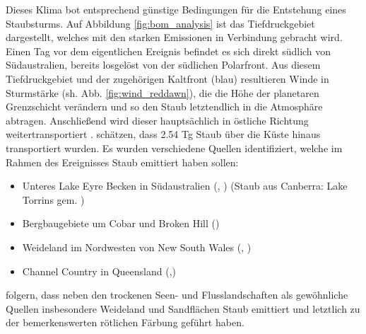 \documentclass[12pt,a4paper,onecolumn,headheight=30pt]{scrartcl}
\begin{document}
Dieses Klima bot entsprechend günstige Bedingungen für die Entstehung eines Staubsturms. Auf Abbildung \ref{fig:bom_analysis} ist das Tiefdruckgebiet dargestellt, welches mit den starken Emissionen in Verbindung gebracht wird. Einen Tag vor dem eigentlichen Ereignis befindet es sich direkt südlich von Südaustralien, bereits losgelöst von der südlichen Polarfront. Aus diesem Tiefdruckgebiet und der zugehörigen Kaltfront (blau) resultieren Winde in Sturmstärke (sh. Abb. \ref{fig:wind_reddawn}), die die Höhe der planetaren Grenzschicht verändern \citep{AlizadehChoobari.2012} und so den Staub letztendlich in die Atmosphäre abtragen. Anschließend wird dieser hauptsächlich in östliche Richtung weitertransportiert \citep{Leys.2011}.\citet{Leys.2011} schätzen, dass 2.54 Tg Staub über die Küste hinaus transportiert wurden.  Es wurden verschiedene Quellen identifiziert, welche im Rahmen des Ereignisses Staub emittiert haben sollen:
\begin{itemize}
\item Unteres Lake Eyre Becken in Südaustralien (\cite{Leys.2011}, \cite{Leys.2009}) (Staub aus Canberra: Lake Torrins gem. \cite{Deckker.2014})
\item Bergbaugebiete um Cobar und Broken Hill  (\cite{Leys.2011})
\item Weideland im Nordwesten von New South Wales (\cite{Leys.2011}, \cite{Leys.2009})
\item Channel Country in Queensland (\cite{Leys.2011},\cite{Leys.2009})
\end{itemize}
\citet{Leys.2011} folgern, dass neben den trockenen Seen- und Flusslandschaften als gewöhnliche Quellen insbesondere Weideland und Sandflächen Staub emittiert und letztlich zu der bemerkenswerten rötlichen Färbung geführt haben.
\end{document}
